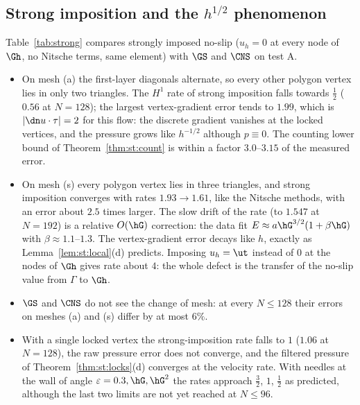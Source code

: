 \subsection{Strong imposition and the \texorpdfstring{$h^{1/2}$}{h^(1/2)} phenomenon}\label{sec:num:strong}
Table~\ref{tab:strong} compares strongly imposed no-slip ($u_h=0$ at every node of $\Gh$, no Nitsche terms, same element) with $\GS$ and $\CNS$ on test A.
\begin{itemize}
\item On mesh (a) the first-layer diagonals alternate, so every other polygon vertex lies in only two triangles. The $H^1$ rate of strong imposition falls towards $\frac12$ ($0.56$ at $N=128$); the largest vertex-gradient error tends to $1.99$, which is $|\dn u\cdot\tau|=2$ for this flow: the discrete gradient vanishes at the locked vertices, and the pressure grows like $h^{-1/2}$ although $p\equiv0$. The counting lower bound of Theorem~\ref{thm:st:count} is within a factor $3.0$--$3.15$ of the measured error.
\item On mesh (s) every polygon vertex lies in three triangles, and strong imposition converges with rates $1.93\to1.61$, like the Nitsche methods, with an error about $2.5$ times larger. The slow drift of the rate (to $1.547$ at $N=192$) is a relative $O(\hG)$ correction: the data fit $E\approx a\hG^{3/2}(1+\beta\hG)$ with $\beta\approx1.1$--$1.3$. The vertex-gradient error decays like $h$, exactly as Lemma~\ref{lem:st:local}(d) predicts. Imposing $u_h=\ut$ instead of $0$ at the nodes of $\Gh$ gives rate about $4$: the whole defect is the transfer of the no-slip value from $\Gamma$ to $\Gh$.
\item $\GS$ and $\CNS$ do not see the change of mesh: at every $N\le128$ their errors on meshes (a) and (s) differ by at most $6\%$.
\item With a single locked vertex the strong-imposition rate falls to $1$ ($1.06$ at $N=128$), the raw pressure error does not converge, and the filtered pressure of Theorem~\ref{thm:st:locks}(d) converges at the velocity rate. With needles at the wall of angle $\varepsilon=0.3,\hG,\hG^2$ the rates approach $\frac32$, $1$, $\frac12$ as predicted, although the last two limits are not yet reached at $N\le96$.
\end{itemize}

